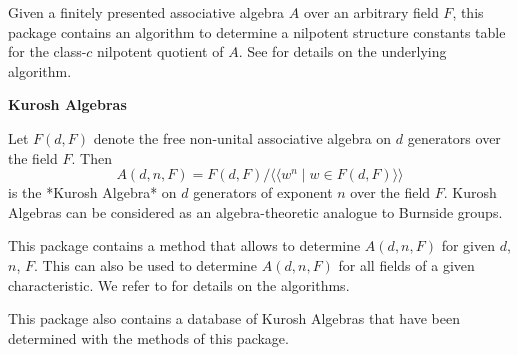 Given a finitely presented associative algebra $A$ over an arbitrary
field $F$, this package contains an algorithm to determine a nilpotent
structure constants table for the class-$c$ nilpotent quotient of $A$. 
See \cite{Eic11} for details on the underlying algorithm.
\medskip

{\bf Kurosh Algebras}

Let $F(d,F)$ denote the free non-unital associative algebra on $d$ 
generators over the field $F$. Then 
$$A(d,n,F) = F(d,F) / \langle \langle w^n \mid w \in F(d,F) \rangle \rangle$$
is the *Kurosh Algebra* on $d$ generators of exponent $n$ over the field
$F$. Kurosh Algebras can be considered as an algebra-theoretic analogue to 
Burnside groups. 

This package contains a method that allows to determine $A(d,n,F)$ for
given $d$, $n$, $F$. This can also be used to determine $A(d,n,F)$ for all
fields of a given characteristic. We refer to \cite{Eic11} for details on
the algorithms.

This package also contains a database of Kurosh Algebras that have been
determined with the methods of this package. 

